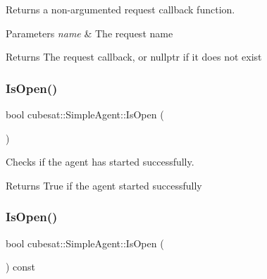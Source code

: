 Returns a non-\/argumented request callback function. 


\begin{DoxyParams}{Parameters}
{\em name} & The request name \\
\hline
\end{DoxyParams}
\begin{DoxyReturn}{Returns}
The request callback, or nullptr if it does not exist 
\end{DoxyReturn}
\mbox{\label{classcubesat_1_1SimpleAgent_ac3c2c3b1eb7d5f1e858f57aa741be3c6}} 
\subsubsection{\texorpdfstring{Is\+Open()}{IsOpen()}\hspace{0.1cm}{\footnotesize\ttfamily [1/2]}}
{\footnotesize\ttfamily bool cubesat\+::\+Simple\+Agent\+::\+Is\+Open (\begin{DoxyParamCaption}{ }\end{DoxyParamCaption})\hspace{0.3cm}{\ttfamily [inline]}}



Checks if the agent has started successfully. 

\begin{DoxyReturn}{Returns}
True if the agent started successfully 
\end{DoxyReturn}
\mbox{\label{classcubesat_1_1SimpleAgent_a7ab6f2f416e8fb1cb5009c3a23d6805a}} 
\subsubsection{\texorpdfstring{Is\+Open()}{IsOpen()}\hspace{0.1cm}{\footnotesize\ttfamily [2/2]}}
{\footnotesize\ttfamily bool cubesat\+::\+Simple\+Agent\+::\+Is\+Open (\begin{DoxyParamCaption}{ }\end{DoxyParamCaption}) const\hspace{0.3cm}{\ttfamily [inline]}}



